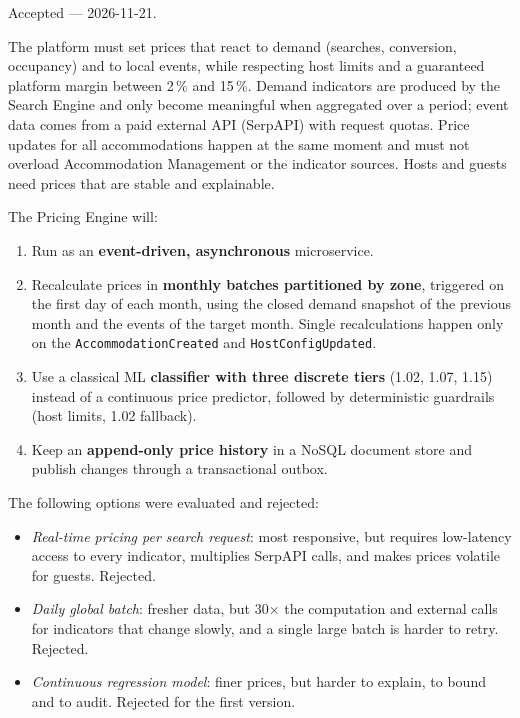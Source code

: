 \documentclass[11pt,a4paper]{article}
\begin{document}
\begin{description}[style=nextline]
  \item[Status] Accepted --- 2026-11-21.

  \item[Context]
  The platform must set prices that react to demand (searches, conversion,
  occupancy) and to local events, while respecting host limits and a
  guaranteed platform margin between 2\,\% and 15\,\%. Demand indicators are
  produced by the Search Engine and only become meaningful when aggregated
  over a period; event data comes from a paid external API (SerpAPI) with
  request quotas. Price updates for all accommodations happen at the same
  moment and must not overload Accommodation Management or the indicator
  sources. Hosts and guests need prices that are stable and explainable.

  \item[Decision]
  The Pricing Engine will:
  \begin{enumerate}
    \item Run as an \textbf{event-driven, asynchronous} microservice.
    \item Recalculate prices in \textbf{monthly batches partitioned by zone},
      triggered on the first day of each month, using the closed demand
      snapshot of the previous month and the events of the target month.
      Single recalculations happen only on the
      \texttt{AccommodationCreated} and
      \texttt{HostConfigUpdated}.
    \item Use a classical ML \textbf{classifier with three discrete tiers}
      (1.02, 1.07, 1.15) instead of a continuous price predictor, followed by
      deterministic guardrails (host limits, 1.02 fallback).
    \item Keep an \textbf{append-only price history} in a NoSQL document store
      and publish changes through a transactional outbox.
  \end{enumerate}

  \item[Alternatives considered]
  The following options were evaluated and rejected:
  \begin{itemize}
    \item \emph{Real-time pricing per search request}: most responsive, but
      requires low-latency access to every indicator, multiplies SerpAPI
      calls, and makes prices volatile for guests. Rejected.
    \item \emph{Daily global batch}: fresher data, but 30$\times$ the
      computation and external calls for indicators that change slowly, and a
      single large batch is harder to retry. Rejected.
    \item \emph{Continuous regression model}: finer prices, but harder to
      explain, to bound and to audit. Rejected for the first version.
  \end{itemize}


\end{description}
\end{document}
